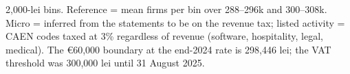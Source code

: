 \begin{table}[!tbp]\centering
\footnotesize
\caption{The 296--300k lei spike in 2025 revenue by tax regime and listed activity}\label{tab:boundary60kregime}
\begin{minipage}{0.95\linewidth}\vspace{2pt}\footnotesize 2,000-lei bins. Reference = mean firms per bin over 288--296k and 300--308k. Micro = inferred from the statements to be on the revenue tax; listed activity = CAEN codes taxed at 3\% regardless of revenue (software, hospitality, legal, medical). The \euro{}60,000 boundary at the end-2024 rate is 298,446 lei; the VAT threshold was 300,000 lei until 31 August 2025.\end{minipage}
\end{table}
